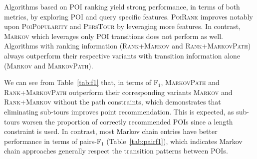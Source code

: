 

Algorithms based on POI ranking yield strong performance, in terms of both metrics, by exploring POI and query specific features.
\textsc{PoiRank} improves notably upon \textsc{PoiPopularity} and \textsc{PersTour} by leveraging more features. %
In contrast, \textsc{Markov} which leverages only POI transitions does not perform as well.
Algorithms with ranking information (\textsc{Rank+Markov} and \textsc{Rank+MarkovPath})
always outperform their respective variants with transition information alone (\textsc{Markov} and \textsc{MarkovPath}).


We can see from Table~\ref{tab:f1} that, in terms of F$_1$, \textsc{MarkovPath} and \textsc{Rank+MarkovPath}
outperform their corresponding variants \textsc{Markov} and \textsc{Rank+Markov} without the path constraints,
which demonstrates that eliminating sub-tours improves point recommendation.
This is expected, as sub-tours worsen the proportion of correctly recommended POIs since a length constraint is used.
In contrast, most Markov chain entries have better performance in terms of pairs-F$_1$ (Table~\ref{tab:pairf1}), %
which indicates %
Markov chain approaches generally respect the transition patterns between POIs.


